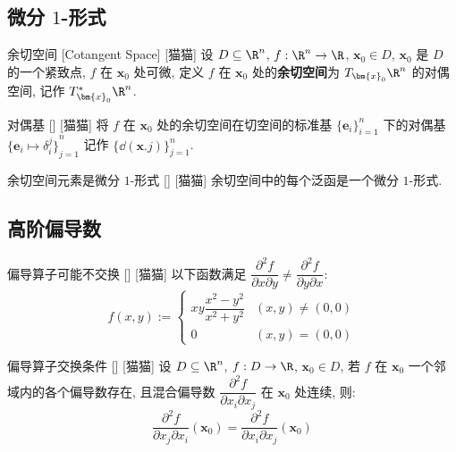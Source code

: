 \documentclass[UTF8]{ctexart}
\begin{document}
		\subsection{微分 \(1\)-形式}

			\begin{dfn}
			    []
			    {余切空间}
			    [Cotangent Space]
			    [猫猫]
				设 \(D\subseteq\R^n\), \(f:\R^n\to\R\), \(\bm{x}_0\in D\), \(\bm{x}_0\) 是 \(D\) 的一个紧致点, \(f\) 在 \(\bm{x}_0\) 处可微, 定义 \(f\) 在 \(\bm{x}_0\) 处的\textbf{余切空间}为 \(T_{\bm{x}_0}\R^n\) 的对偶空间, 记作 \(T^*_{\bm{x}_0}\R^n\). 
			\end{dfn}

			\begin{dfn}
			    []
			    {对偶基}
			    []
			    [猫猫]
				将 \(f\) 在 \(\bm{x}_0\) 处的余切空间在切空间的标准基 \({\{\bm{e}_i\}}_{i=1}^n\) 下的对偶基 \({\{\bm{e}_i\mapsto\delta_i^j\}}_{j=1}^n\) 记作 \({\{\dd(\bm{x}.j)\}}_{j=1}^n\). 
			\end{dfn}

			\begin{ppt}
				[]
				{余切空间元素是微分 \(1\)-形式}
				[]
				[猫猫]
				余切空间中的每个泛函是一个微分 \(1\)-形式. 
			\end{ppt}

		\subsection{高阶偏导数}
			
			\begin{cxmp}
				[]
				{偏导算子可能不交换}
				[]
				[猫猫]
				以下函数满足 \(\dfrac{\partial^2 f}{\partial x\partial y}\neq\dfrac{\partial^2 f}{\partial y\partial x}\): 
				\[f(x,y):=
				\begin{cases}
					xy\dfrac{x^2-y^2}{x^2+y^2} & (x,y)\neq(0,0)\\
					0 & (x,y)=(0,0)
				\end{cases}\]
			\end{cxmp}
			
			\begin{thm}
				[]
				{偏导算子交换条件}
				[]
				[猫猫]
				设 \(D\subseteq\R^n\), \(f:D\to\R\), \(\bm{x}_0\in D\), 若 \(f\) 在 \(\bm{x}_0\) 一个邻域内的各个偏导数存在, 且混合偏导数 \(\dfrac{\partial^2 f}{\partial x_i\partial x_j}\) 在 \(\bm{x}_0\) 处连续, 则: 
				\[\dfrac{\partial^2 f}{\partial x_j\partial x_i}(\bm{x}_0)=\dfrac{\partial^2 f}{\partial x_i\partial x_j}(\bm{x}_0)\]
			\end{thm}
			
\end{document}
